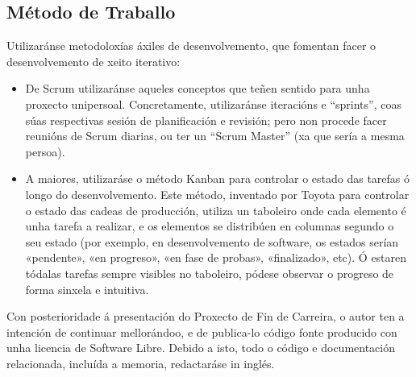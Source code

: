 \subsection*{Método de Traballo}

Utilizaránse metodoloxías áxiles de desenvolvemento, que fomentan
facer o desenvolvemento de xeito iterativo:

\begin{itemize}
\item De Scrum utilizaránse aqueles conceptos que teñen sentido para unha
	proxecto unipersoal. Concretamente, utilizaránse iteracións e “sprints”,
	coas súas respectivas sesión de planificación e revisión; pero non
	procede facer reunións de Scrum diarias, ou ter un “Scrum Master” (xa
	que sería a mesma persoa).

\item A maiores, utilizaráse o método Kanban para controlar o estado das
	tarefas ó longo do desenvolvemento. Este método, inventado por Toyota
	para controlar o estado das cadeas de producción, utiliza un taboleiro
	onde cada elemento é unha tarefa a realizar, e os elementos se
	distribúen en columnas segundo o seu estado (por exemplo, en
	desenvolvemento de software, os estados serían «pendente», «en progreso»,
	«en fase de probas», «finalizado», etc). Ó estaren tódalas tarefas sempre
	visibles no taboleiro, pódese observar o progreso de forma sinxela e
	intuitiva.
\end{itemize}

Con posterioridade á presentación do Proxecto de Fin de Carreira, o autor
ten a intención de continuar mellorándoo, e de publica-lo código fonte
producido con unha licencia de Software Libre. Debido a isto, todo o código
e documentación relacionada, incluída a memoria, redactaráse in inglés.

